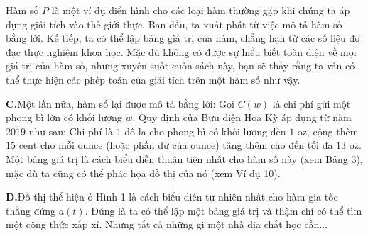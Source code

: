\documentclass[10pt,letterpaper]{article}
\begin{document}
\begin{minipage}[t]{0.71\textwidth}
    \vspace{0.3cm}
    Hàm số $P$ là một ví dụ điển hình cho các loại hàm thường gặp khi chúng ta áp dụng giải tích vào thế giới thực. Ban đầu, ta xuất phát từ việc mô tả hàm số bằng lời. Kế tiếp, ta có thể lập bảng giá trị của hàm, chẳng hạn từ các số liệu đo đạc thực nghiệm khoa học. Mặc dù không có được sự hiểu biết toàn diện về mọi giá trị của hàm số, nhưng xuyên suốt cuốn sách này, bạn sẽ thấy rằng ta vẫn có thể thực hiện các phép toán của giải tích trên một hàm số như vậy.

    \vspace{0.15cm}
    \textbf{C.}\quad Một lần nữa, hàm số lại được mô tả bằng lời: Gọi $C(w)$ là chi phí gửi một phong bì lớn có khối lượng $w$. Quy định của Bưu điện Hoa Kỳ áp dụng từ năm 2019 như sau: Chi phí là $1$ đô la cho phong bì có khối lượng đến $1\text{ oz}$, cộng thêm $15\text{ cent}$ cho mỗi ounce (hoặc phần dư của ounce) tăng thêm cho đến tối đa $13\text{ oz}$. Một bảng giá trị là cách biểu diễn thuận tiện nhất cho hàm số này (xem Bảng 3), mặc dù ta cũng có thể phác họa đồ thị của nó (xem Ví dụ 10).

    \vspace{0.15cm}
    \textbf{D.}\quad Đồ thị thể hiện ở Hình 1 là cách biểu diễn tự nhiên nhất cho hàm gia tốc thẳng đứng $a(t)$. Đúng là ta có thể lập một bảng giá trị và thậm chí có thể tìm một công thức xấp xỉ. Nhưng tất cả những gì một nhà địa chất học cần...
\end{minipage}

\newpage
\fancyhead[R]{}
\end{document}
